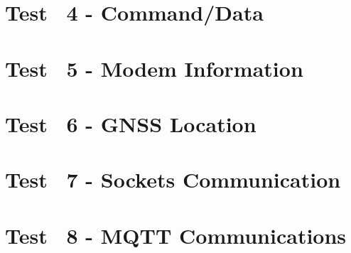 \documentclass[twoside]{book}
\newcommand{\+}{\discretionary{\mbox{\scriptsize$\hookleftarrow$}}{}{}}
\begin{document}
\chapter{Test ~4 -\/ Command/\+Data}
\label{md__c___users__greg_terrell__documents__code_dev__arduino_libraries__loo_u_q__l_t_em_c_tests_ltemc_04_atcmd__r_e_a_d_m_e}

\chapter{Test ~5 -\/ Modem Information}
\label{md__c___users__greg_terrell__documents__code_dev__arduino_libraries__loo_u_q__l_t_em_c_tests_ltemc_05_modeminfo__r_e_a_d_m_e}

\chapter{Test ~6 -\/ GNSS Location}
\label{md__c___users__greg_terrell__documents__code_dev__arduino_libraries__loo_u_q__l_t_em_c_tests_ltemc_06_gnss__r_e_a_d_m_e}

\chapter{Test ~7 -\/ Sockets Communication}
\label{md__c___users__greg_terrell__documents__code_dev__arduino_libraries__loo_u_q__l_t_em_c_tests_ltemc_07_sockets__r_e_a_d_m_e}

\chapter{Test ~8 -\/ MQTT Communications}
\label{md__c___users__greg_terrell__documents__code_dev__arduino_libraries__loo_u_q__l_t_em_c_tests_ltemc_08_mqtt__r_e_a_d_m_e}

\end{document}
